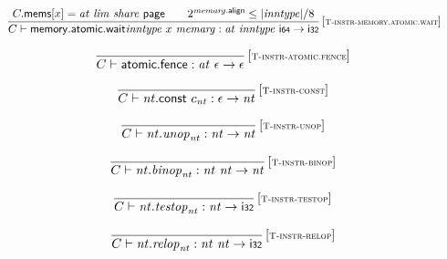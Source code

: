 $$
\begin{array}{@{}c@{}}\displaystyle
\frac{
C{.}\mathsf{mems}{}[x] = {\mathit{at}}~{\mathit{lim}}~{\mathit{share}}~\mathsf{page}
 \qquad
{2^{{\mathit{memarg}}{.}\mathsf{align}}} \leq {|{\mathit{inntype}}|} / 8
}{
C \vdash {\mathsf{memory{.}atomic{.}wait}}{{\mathit{inntype}}}~x~{\mathit{memarg}} : {\mathit{at}}~{\mathit{inntype}}~\mathsf{i{\scriptstyle 64}} \rightarrow \mathsf{i{\scriptstyle 32}}
} \, {[\textsc{\scriptsize T{-}instr{-}memory.atomic.wait}]}
\qquad
\end{array}
$$

$$
\begin{array}{@{}c@{}}\displaystyle
\frac{
}{
C \vdash \mathsf{atomic{.}fence} : {\mathit{at}}~\epsilon \rightarrow \epsilon
} \, {[\textsc{\scriptsize T{-}instr{-}atomic.fence}]}
\qquad
\end{array}
$$

\vspace{1ex}

$$
\begin{array}{@{}c@{}}\displaystyle
\frac{
}{
C \vdash {\mathit{nt}}{.}\mathsf{const}~c_{\mathit{nt}} : \epsilon \rightarrow {\mathit{nt}}
} \, {[\textsc{\scriptsize T{-}instr{-}const}]}
\qquad
\end{array}
$$

$$
\begin{array}{@{}c@{}}\displaystyle
\frac{
}{
C \vdash {\mathit{nt}} {.} {\mathit{unop}}_{\mathit{nt}} : {\mathit{nt}} \rightarrow {\mathit{nt}}
} \, {[\textsc{\scriptsize T{-}instr{-}unop}]}
\qquad
\end{array}
$$

$$
\begin{array}{@{}c@{}}\displaystyle
\frac{
}{
C \vdash {\mathit{nt}} {.} {\mathit{binop}}_{\mathit{nt}} : {\mathit{nt}}~{\mathit{nt}} \rightarrow {\mathit{nt}}
} \, {[\textsc{\scriptsize T{-}instr{-}binop}]}
\qquad
\end{array}
$$

$$
\begin{array}{@{}c@{}}\displaystyle
\frac{
}{
C \vdash {\mathit{nt}} {.} {\mathit{testop}}_{\mathit{nt}} : {\mathit{nt}} \rightarrow \mathsf{i{\scriptstyle 32}}
} \, {[\textsc{\scriptsize T{-}instr{-}testop}]}
\qquad
\end{array}
$$

$$
\begin{array}{@{}c@{}}\displaystyle
\frac{
}{
C \vdash {\mathit{nt}} {.} {\mathit{relop}}_{\mathit{nt}} : {\mathit{nt}}~{\mathit{nt}} \rightarrow \mathsf{i{\scriptstyle 32}}
} \, {[\textsc{\scriptsize T{-}instr{-}relop}]}
\qquad
\end{array}
$$

